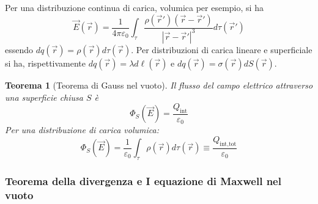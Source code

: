 \documentclass[10pt, a4paper]{scrartcl}
\numberwithin{equation}{subsection}
\theoremstyle{style1}
\newtheorem{teorema}{Teorema}[section]
\begin{document}
Per una distribuzione continua di carica, volumica per esempio, si ha
\begin{equation}
	\vec{E}(\vec{r}) =\frac{1}{4\pi \varepsilon _0} \int_{\tau } \frac{\rho (\vec{r}')(\vec{r}-\vec{r}')}{\left\lvert \vec{r} - \vec{r}' \right\rvert^3 }d\tau (\vec{r}')
\end{equation}
essendo $dq(\vec{r}) = \rho (\vec{r}) d\tau (\vec{r})$. Per distribuzioni di carica lineare e superficiale si ha, rispettivamente $dq(\vec{r})=\lambda d\ell (\vec{r})$ e $dq(\vec{r}) = \sigma (\vec{r}) dS(\vec{r})$.

\begin{teorema}
	[Teorema di Gauss nel vuoto]
	Il flusso del campo elettrico attraverso una superficie chiusa $S$ \`e 
	\begin{equation}
		\Phi _S(\vec{E}) = \frac{Q_\text{int}}{\varepsilon_0}
	\end{equation}
	Per una distribuzione di carica volumica:
\begin{equation}
	\Phi _S(\vec{E}) = \frac{1}{\varepsilon _0} \int_{\tau } \rho (\vec{r}) d\tau (\vec{r})\equiv \frac{Q_\text{int,tot}}{\varepsilon_0}
\end{equation}	
\end{teorema}
\subsubsection{Teorema della divergenza e I equazione di Maxwell nel vuoto}
\end{document}
